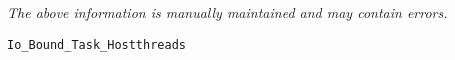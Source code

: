 \label{pkg:io\_bound\_task\_hostthreads}

{\tiny \it The above information is manually maintained and may contain errors.}
\begin{verbatim}
Io_Bound_Task_Hostthreads
\end{verbatim}
